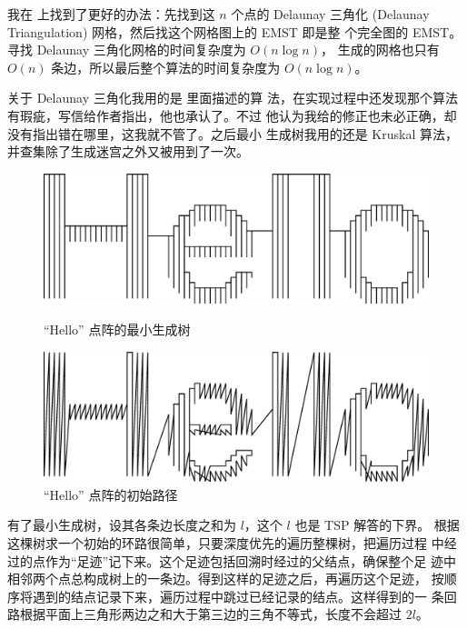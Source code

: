 \documentclass[cs4size,a4paper,adobefonts]{ctexart}
\begin{document}
我在 \cite{wiki:EMST} 上找到了更好的办法：先找到这 $n$ 个点的 Delaunay
三角化 (Delaunay Triangulation) 网格，然后找这个网格图上的 EMST 即是整
个完全图的 EMST。寻找 Delaunay 三角化网格的时间复杂度为 $O(n\log n)$，
生成的网格也只有 $O(n)$ 条边，所以最后整个算法的时间复杂度为 $O(n\log
n)$。

关于 Delaunay 三角化我用的是 \cite{Berg:2008:CGA:1370949} 里面描述的算
法，在实现过程中还发现那个算法有瑕疵，写信给作者指出，他也承认了。不过
他认为我给的修正也未必正确，却没有指出错在哪里，这我就不管了。之后最小
生成树我用的还是 Kruskal 算法，并查集除了生成迷宫之外又被用到了一次。

\begin{figure}[htbp]
  \centering
  \begin{minipage}{0.5\textwidth}
    \centering
    \includegraphics[width=0.95\linewidth]{helloEMST}
    \caption{``Hello'' 点阵的最小生成树}\label{fig:helloEMST}
  \end{minipage}%
  \begin{minipage}{0.5\textwidth}
    \centering
    \includegraphics[width=0.95\linewidth]{helloInit}
    \caption{``Hello'' 点阵的初始路径}\label{fig:helloInit}
  \end{minipage}
\end{figure}

有了最小生成树，设其各条边长度之和为 $l$，这个 $l$ 也是 TSP 解答的下界。
根据这棵树求一个初始的环路很简单，只要深度优先的遍历整棵树，把遍历过程
中经过的点作为“足迹”记下来。这个足迹包括回溯时经过的父结点，确保整个足
迹中相邻两个点总构成树上的一条边。得到这样的足迹之后，再遍历这个足迹，
按顺序将遇到的结点记录下来，遍历过程中跳过已经记录的结点。这样得到的一
条回路根据平面上三角形两边之和大于第三边的三角不等式，长度不会超过
$2l$。
\end{document}

